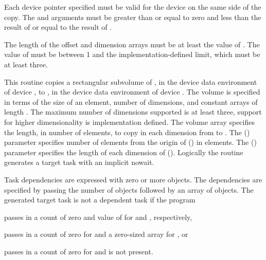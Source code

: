 \constraints
Each device pointer specified must be valid for the device on the same side
of the copy. The  and
 arguments must be greater than or equal to zero and
less than the result of  or equal to
the result of .

The length of the offset and dimension arrays must be at least the
value of .
The value of  must be between 1 and the implementation-defined
limit, which must be at least three.

\effect
This routine copies a rectangular subvolume of ,
in the device data environment of device ,
to , in the device data environment of device .
The volume is specified in terms of the size of an element,
number of dimensions, and constant arrays of length .  The
maximum number of dimensions supported is at least three, support for higher
dimensionality is implementation defined. The volume array specifies the
length, in number of elements, to copy in each dimension from 
to . The  () parameter specifies
number of elements from the origin of  () in elements.
The  () parameter specifies the
length of each dimension of  ().
Logically the  routine generates a target task with an implicit nowait.

Task dependencies are expressed with zero or more 
objects. The dependencies are specified by passing the
number of  objects followed by an array of
 objects. The generated target task is not a
dependent task if the program
\begin{itemize}
\begin{ccppspecific}
\item passes in a count of zero and value of  for
 and , respectively,
\end{ccppspecific}

\begin{fortranspecific}
\item passes in a count of zero for  and a zero-sized array for , or
\item passes in a count of zero for  and  is not present.
\end{fortranspecific}
\end{itemize}

